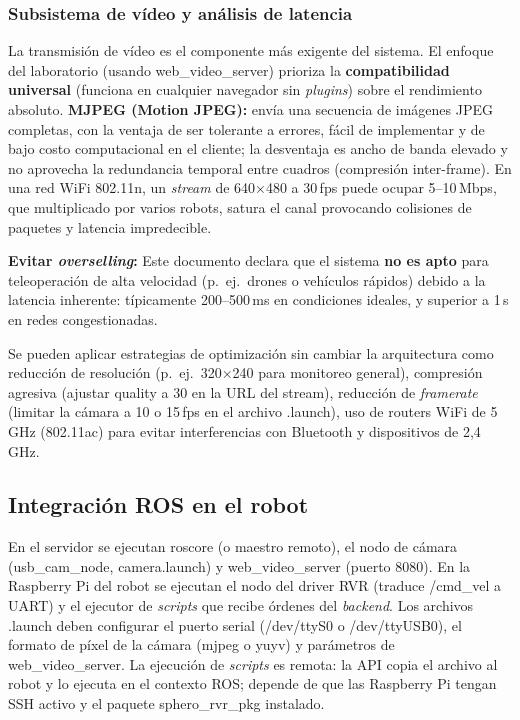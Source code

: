 \documentclass[12pt]{article}
\numberwithin{figure}{section}
\numberwithin{table}{section}
\def\code#1{#1}%
\def\file#1{#1}%
\newcommand{\code}[1]{\textcolor{codeblue}{\url{#1}}}
\newcommand{\file}[1]{\textcolor{darkblue}{\url{#1}}}
\begin{document}
\subsubsection{Subsistema de vídeo y análisis de latencia}

La transmisión de vídeo es el componente más exigente del sistema. El enfoque del laboratorio (usando \code{web\_video\_server}) prioriza la \textbf{compatibilidad universal} (funciona en cualquier navegador sin \textit{plugins}) sobre el rendimiento absoluto. \textbf{MJPEG (Motion JPEG):} envía una secuencia de imágenes JPEG completas, con la ventaja de ser tolerante a errores, fácil de implementar y de bajo costo computacional en el cliente; la desventaja es ancho de banda elevado y no aprovecha la redundancia temporal entre cuadros (compresión inter-frame). En una red WiFi 802.11n, un \textit{stream} de 640×480 a 30\,fps puede ocupar 5--10\,Mbps, que multiplicado por varios robots, satura el canal provocando colisiones de paquetes y latencia impredecible.

\begin{warningbox}
\textbf{Evitar \textit{overselling}:} Este documento declara que el sistema \textbf{no es apto} para teleoperación de alta velocidad (p.\ ej.\ drones o vehículos rápidos) debido a la latencia inherente: típicamente 200--500\,ms en condiciones ideales, y superior a 1\,s en redes congestionadas.
\end{warningbox}

Se pueden aplicar estrategias de optimización sin cambiar la arquitectura como reducción de resolución (p.\ ej.\ 320×240 para monitoreo general), compresión agresiva (ajustar \code{quality} a 30 en la URL del stream), reducción de \textit{framerate} (limitar la cámara a 10 o 15\,fps en el archivo \file{.launch}), uso de routers WiFi de 5\,GHz (802.11ac) para evitar interferencias con Bluetooth y dispositivos de 2,4\,GHz.


\subsection{Integración ROS en el robot}

En el servidor se ejecutan \code{roscore} (o maestro remoto), el nodo de cámara (\code{usb\_cam\_node}, \file{camera.launch}) y \code{web\_video\_server} (puerto 8080). En la Raspberry Pi del robot se ejecutan el nodo del driver RVR (traduce \code{/cmd\_vel} a UART) y el ejecutor de \textit{scripts} que recibe órdenes del \textit{backend}. Los archivos \file{.launch} deben configurar el puerto serial (\code{/dev/ttyS0} o \code{/dev/ttyUSB0}), el formato de píxel de la cámara (\code{mjpeg} o \code{yuyv}) y parámetros de \code{web\_video\_server}. La ejecución de \textit{scripts} es remota: la API copia el archivo al robot y lo ejecuta en el contexto ROS; depende de que las Raspberry Pi tengan SSH activo y el paquete \code{sphero\_rvr\_pkg} instalado.
\end{document}
